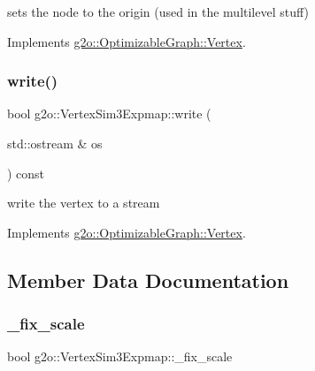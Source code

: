 sets the node to the origin (used in the multilevel stuff) 



Implements \mbox{\hyperlink{classg2o_1_1_optimizable_graph_1_1_vertex_abd5fe36815f27a9c174ad41c2070c247}{g2o\+::\+Optimizable\+Graph\+::\+Vertex}}.

\mbox{\label{classg2o_1_1_vertex_sim3_expmap_ab5725f98a0d40f4cdb5d352a45c79fc7}} 
\subsubsection{\texorpdfstring{write()}{write()}}
{\footnotesize\ttfamily bool g2o\+::\+Vertex\+Sim3\+Expmap\+::write (\begin{DoxyParamCaption}\item[{std\+::ostream \&}]{os }\end{DoxyParamCaption}) const\hspace{0.3cm}{\ttfamily [virtual]}}



write the vertex to a stream 



Implements \mbox{\hyperlink{classg2o_1_1_optimizable_graph_1_1_vertex_a4cac277db656fddb5f844d9009d601eb}{g2o\+::\+Optimizable\+Graph\+::\+Vertex}}.



\subsection{Member Data Documentation}
\mbox{\label{classg2o_1_1_vertex_sim3_expmap_a63854235b605e45825798d327890930e}} 
\subsubsection{\texorpdfstring{\+\_\+fix\+\_\+scale}{\_fix\_scale}}
{\footnotesize\ttfamily bool g2o\+::\+Vertex\+Sim3\+Expmap\+::\+\_\+fix\+\_\+scale}

\mbox{\label{classg2o_1_1_vertex_sim3_expmap_a05a79614b17cc700acaeb86039c2e181}} 
